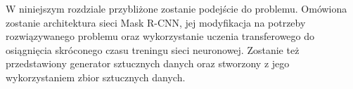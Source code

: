 W niniejszym rozdziale przybliżone zostanie podejście do problemu.
Omówiona zostanie architektura sieci Mask R-CNN, jej modyfikacja na potrzeby rozwiązywanego problemu oraz wykorzystanie uczenia transferowego do osiągnięcia skróconego czasu treningu sieci neuronowej.
Zostanie też przedstawiony generator sztucznych danych oraz stworzony z jego wykorzystaniem zbior sztucznych danych.
